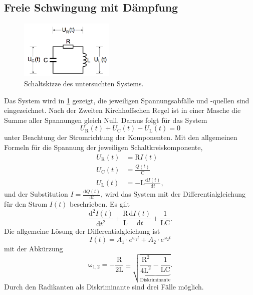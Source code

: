 \subsection{Freie Schwingung mit Dämpfung}
\label{sec:theorie1}
\begin{figure}[h]
	\centering
	\includegraphics[width=0.4\textwidth]{Bilder/Maschenfoto1.png}
	\caption{Schaltskizze des untersuchten Systems. \cite{v354}}
	\label{fig:schaltkreis_rein}
\end{figure}
Das System wird in \ref{fig:schaltkreis_rein} gezeigt, die jeweiligen Spannungsabfälle und -quellen sind eingezeichnet.
Nach der Zweiten Kirchhoffschen Regel ist in einer Masche die Summe aller Spannungen gleich Null. 
Daraus folgt für das System
\begin{equation}
	U_\text{R}(t)+U_\text{C}(t)-U_\text{L}(t)=0
\end{equation}
unter Beachtung der Stromrichtung der Komponenten.
Mit den allgemeinen Formeln für die Spannung der jeweiligen Schaltkreiskomponente,
\begin{align}
	U_\text{R}(t) &= \text{R} I(t)\\
	U_\text{C}(t) &= \frac{Q(t)}{\text{C}} \\
	U_\text{L}(t) &= -\text{L}\frac{\mathup{d}I(t)}{\mathup{d}t},
\end{align}
und der Substitution
$I=\frac{\mathup{d}Q(t)}{\mathup{d}t}$,
wird das System mit der Differentialgleichung für den Strom $I(t)$ beschrieben.
Es gilt
\begin{equation}
	\frac{\mathup{d^2}I(t)}{\mathup{d}t^2}+\frac{\mathup{R}}{\mathup{L}}\frac{\mathup{d}I(t)}{\mathup{d}t}+\frac{1}{\mathup{LC}}.
\end{equation}
Die allgemeine Lösung der Differentialgleichung ist
\begin{equation}
	I(t) = A_1\cdot e^{\mathup{\omega_1}t} +A_2\cdot e^{\mathup{\omega_2}t}
	\label{eq:allgloesung}
\end{equation}
mit der Abkürzung
\begin{equation}
	\mathup{\omega_{1,2}}= -\frac{\mathup{R}}{2\mathup{L}}\pm\sqrt{\underbrace{\frac{\mathup{R^2}}{4\mathup{L^2}}-\frac{1}{\mathup{LC}}}_{\text{Diskriminante}}}.
	\label{eq:allomega}
\end{equation}
Durch den Radikanten als Diskriminante sind drei Fälle möglich.


